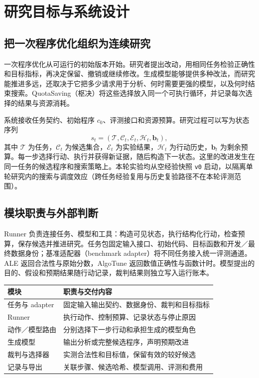 \section{研究目标与系统设计}
\label{sec:system}
\subsection{把一次程序优化组织为连续研究}
一次程序优化从可运行的初始版本开始。研究者提出改动，用相同任务检验正确性和目标指标，再决定保留、撤销或继续修改。生成模型能够提供多种改法，而研究能推进多远，还取决于它把多少请求用于分析、何时需要更强的模型，以及何时结束搜索。QuotaSaving（枢决）将这些选择放入同一个可执行循环，并记录每次选择的结果与资源消耗。

系统接收任务契约、初始程序 $c_0$、评测接口和资源预算。研究过程可以写为状态序列
\begin{equation}
 s_t=(\mathcal{T},\mathcal{C}_t,\mathcal{E}_t,\mathcal{H}_t,\mathbf{b}_t),
\end{equation}
其中 $\mathcal{T}$ 为任务，$\mathcal{C}_t$ 为候选集合，$\mathcal{E}_t$ 为实验结果，$\mathcal{H}_t$ 为行动历史，$\mathbf{b}_t$ 为剩余预算。每一步选择行动、执行并获得新证据，随后构造下一状态。这里的改进发生在同一任务的候选程序和搜索策略上。本轮实验均从空经验快照 \texttt{v0} 启动，以隔离单轮研究内的搜索与调度效应（跨任务经验复用与历史复验路径不在本轮评测范围）。

\subsection{模块职责与外部判断}
Runner 负责连接任务、模型和工具：构造可见状态，执行结构化行动，检查预算，保存候选并推进研究。任务包固定输入接口、初始代码、目标函数和开发／最终数据身份；基准适配器（benchmark adapter）将不同任务接入统一评测通道。ALE 返回合法性与原始分数，AlgoTune 返回数值正确性与函数计时。模型提出的目的、假设和预期结果随行动记录，裁判结果则独立写入运行账本。

\par\noindent
\begin{tabularx}{\linewidth}{@{}lX@{}}\toprule
模块 & 职责与交付内容\\\midrule
任务与 adapter & 固定输入输出契约、数据身份、裁判和目标指标\\
Runner & 执行动作、控制预算、记录状态与停止原因\\
动作／模型路由 & 分别选择下一步行动和承担生成的模型角色\\
生成模型 & 输出分析或完整候选程序，声明预期改进\\
裁判与选择器 & 实测合法性和目标值，保留有效的较好候选\\
记录与导出 & 关联步骤、候选哈希、模型调用、评测和费用\\\bottomrule
\end{tabularx}\par

